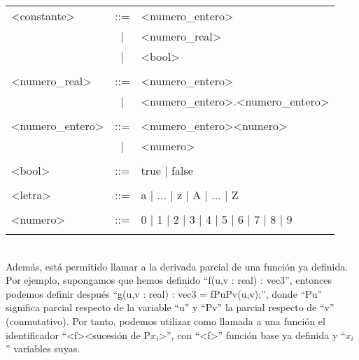 \begin{tabular}{| p{3.5cm} c p{10cm} |}
\hline
<constante>               &::=&  <numero\_entero> \\
                           &|&  <numero\_real> \\
                           &|&  <bool> \\
&&\\

<numero\_real>             &::=&  <numero\_entero> \\
                           &|&  <numero\_entero>.<numero\_entero> \\
&&\\

<numero\_entero>           &::=&  <numero\_entero><numero> \\
                           &|&  <numero> \\
&&\\

<bool>                    &::=&  true | false \\
&&\\

<letra>                   &::=&  a | ... | z | A | ... | Z \\
&&\\

<numero>                  &::=&  0 | 1 | 2 | 3 | 4 | 5 | 6 | 7 | 8 | 9 \\
&&\\
\hline
\end{tabular}
\vspace{0.5cm}
\\Además, está permitido llamar a la derivada parcial de una función ya definida. Por ejemplo, supongamos que hemos definido ``f(u,v : real) : vec3'', entonces podemos definir después ``g(u,v : real) : vec3 = fPuPv(u,v);'', donde ``Pu'' significa parcial respecto de la variable ``u'' y ``Pv'' la parcial respecto de ``v'' (conmutativo). Por tanto, podemos utilizar como llamada a una función el identificador ``<f><sucesión de P$x_i$>'', con ``<f>'' función base ya definida y ``$x_i$'' variables suyas.

\endinput

